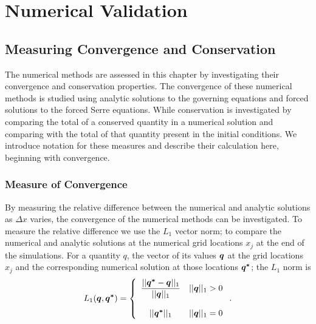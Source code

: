 
\chapter{Numerical Validation}
\label{chp:NumMethodComp}


\section{Measuring Convergence and Conservation}
The numerical methods are assessed in this chapter by investigating their convergence and conservation properties. The convergence of these numerical methods is studied using analytic solutions to the governing equations and forced solutions to the forced Serre equations. While conservation is investigated by comparing the total of a conserved quantity in a numerical solution and comparing with the total of that quantity present in the initial conditions. We introduce notation for these measures and describe their calculation here, beginning with convergence.

\subsection{Measure of Convergence}
By measuring the relative difference between the numerical and analytic solutions as $\Delta x$ varies, the convergence of the numerical methods can be investigated. To measure the relative difference we use the $L_1$ vector norm; to compare the numerical and analytic solutions at the numerical grid locations $x_j$ at the end of the simulations. For a quantity $q$, the vector of its values $\boldsymbol{q}$ at the grid locations $x_j$ and the corresponding numerical solution at those locations $\boldsymbol{q^*}$; the $L_1$ norm is
\begin{equation}
L_1(\boldsymbol{q},\boldsymbol{q^*}) =  \left\lbrace \begin{array}{c r} 
\dfrac{||\boldsymbol{q^*} - \boldsymbol{q}||_{1}}{||\boldsymbol{q}||_{1}} & ||\boldsymbol{q}||_{1} > 0 \\ \\
{||\boldsymbol{q^*}||_{1}} & ||\boldsymbol{q}||_{1} = 0  \end{array}\right. . 
\label{eqn:L1qdef} 
\end{equation}





